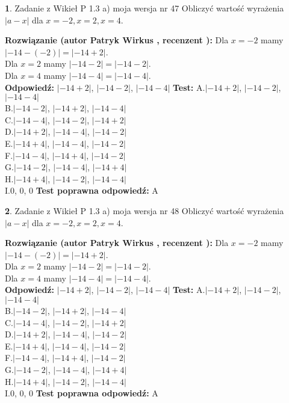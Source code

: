 \documentclass[12pt, a4paper]{article}
\theoremstyle{definition} %
\newtheorem{zad}{}
\newcommand{\zadStart}[1]{\begin{zad}#1\newline}
\newcommand{\zadStop}{\end{zad}}
\newcommand{\rozwStart}[2]{\noindent \textbf{Rozwiązanie (autor #1 , recenzent #2): }\newline}
\newcommand{\rozwStop}{\newline}
\newcommand{\odpStart}{\noindent \textbf{Odpowiedź:}\newline}
\newcommand{\odpStop}{\newline}
\newcommand{\testStart}{\noindent \textbf{Test:}\newline}
\newcommand{\testStop}{\newline}
\newcommand{\kluczStart}{\noindent \textbf{Test poprawna odpowiedź:}\newline}
\newcommand{\kluczStop}{\newline}
\begin{document}
\zadStart{Zadanie z Wikieł P 1.3 a) moja wersja nr 47}
Obliczyć wartość wyrażenia $|a - x|$ dla $x=-2,x=2,x=4$.
\zadStop
\rozwStart{Patryk Wirkus}{}
Dla $x = -2$ mamy $|-14 - (-2)| = |-14 + 2|$.\\
Dla $x = 2$ mamy $|-14 - 2| = |-14 - 2|$.\\
Dla $x = 4$ mamy $|-14 - 4| = |-14 - 4|$.\\
\rozwStop
\odpStart
$|-14 + 2|$, $|-14 - 2|$, $|-14 - 4|$
\odpStop
\testStart
A.$|-14 + 2|$, $|-14 - 2|$, $|-14 - 4|$\\
B.$|-14 - 2|$, $|-14 + 2|$, $|-14 - 4|$\\
C.$|-14 - 4|$, $|-14 - 2|$, $|-14 + 2|$\\
D.$|-14 + 2|$, $|-14 - 4|$, $|-14 - 2|$\\
E.$|-14 + 4|$, $|-14 - 4|$, $|-14 - 2|$\\
F.$|-14 - 4|$, $|-14 + 4|$, $|-14 - 2|$\\
G.$|-14 - 2|$, $|-14 - 4|$, $|-14 + 4|$\\
H.$|-14 + 4|$, $|-14 - 2|$, $|-14 - 4|$\\
I.$0$, $0$, $0$
\testStop
\kluczStart
A
\kluczStop



\zadStart{Zadanie z Wikieł P 1.3 a) moja wersja nr 48}
Obliczyć wartość wyrażenia $|a - x|$ dla $x=-2,x=2,x=4$.
\zadStop
\rozwStart{Patryk Wirkus}{}
Dla $x = -2$ mamy $|-14 - (-2)| = |-14 + 2|$.\\
Dla $x = 2$ mamy $|-14 - 2| = |-14 - 2|$.\\
Dla $x = 4$ mamy $|-14 - 4| = |-14 - 4|$.\\
\rozwStop
\odpStart
$|-14 + 2|$, $|-14 - 2|$, $|-14 - 4|$
\odpStop
\testStart
A.$|-14 + 2|$, $|-14 - 2|$, $|-14 - 4|$\\
B.$|-14 - 2|$, $|-14 + 2|$, $|-14 - 4|$\\
C.$|-14 - 4|$, $|-14 - 2|$, $|-14 + 2|$\\
D.$|-14 + 2|$, $|-14 - 4|$, $|-14 - 2|$\\
E.$|-14 + 4|$, $|-14 - 4|$, $|-14 - 2|$\\
F.$|-14 - 4|$, $|-14 + 4|$, $|-14 - 2|$\\
G.$|-14 - 2|$, $|-14 - 4|$, $|-14 + 4|$\\
H.$|-14 + 4|$, $|-14 - 2|$, $|-14 - 4|$\\
I.$0$, $0$, $0$
\testStop
\kluczStart
A
\kluczStop
\end{document}
